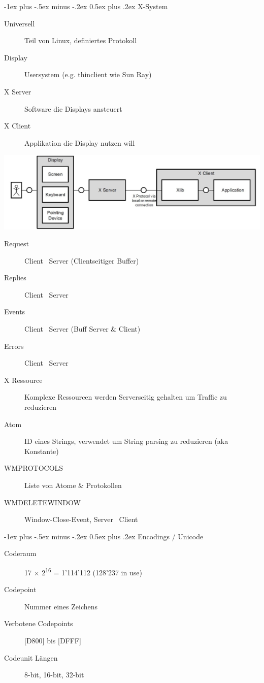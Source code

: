 \documentclass[10pt,landscape,a4paper]{article}
\makeatletter
\renewcommand{\section}{\@startsection{section}{1}{0mm}%
                                {-1ex plus -.5ex minus -.2ex}%
                                {0.5ex plus .2ex}%
                                {\normalfont\large\bfseries}}
\makeatother
\begin{document}
\begin{multicols*}{4}
\section{X-System}
\begin{description}
  \item[Universell] Teil von Linux, definiertes Protokoll
  \item[Display] Usersystem (e.g. thinclient wie Sun Ray)
  \item[X Server] Software die Displays ansteuert
  \item[X Client] Applikation die Display nutzen will
\end{description}
\includegraphics[width=1.0\linewidth]{04_X.JPG}
\begin{description}
  \item[Request] Client \textrightarrow~Server (Clientseitiger Buffer)
  \item[Replies] Client \textleftarrow~Server
  \item[Events] Client \textleftarrow~Server (Buff Server \& Client)
  \item[Errors] Client \textleftarrow~Server
  \item[X Ressource] Komplexe Ressourcen werden Serverseitig gehalten um Traffic zu reduzieren
  \item[Atom] ID eines Strings, verwendet um String parsing zu reduzieren (aka Konstante)
  \item[WM\textunderscore PROTOCOLS] Liste von Atome \& Protokollen
  \item[WM\textunderscore DELETE\textunderscore WINDOW] Window-Close-Event, Server \textrightarrow~Client
\end{description}



\section{Encodings / Unicode}
\begin{description}
  \item[Coderaum] 17 × 2\textsuperscript{16} = 1'114'112 (128'237 in use)
  \item[Codepoint] Nummer eines Zeichens
  \item[Verbotene Codepoints] [D800] bis [DFFF]
  \item[Codeunit Längen] 8-bit, 16-bit, 32-bit
\end{description}


\end{multicols*}
\end{document}
